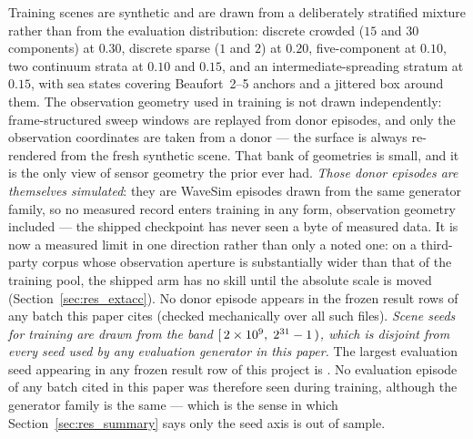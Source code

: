 \documentclass[review]{elsarticle}
\begin{document}
Training scenes are synthetic and are drawn from a deliberately stratified mixture
rather than from the evaluation distribution: discrete crowded ($15$ and $30$
components) at $0.30$, discrete sparse ($1$ and $2$) at $0.20$, five-component at
$0.10$, two continuum strata at $0.10$ and $0.15$, and an intermediate-spreading
stratum at $0.15$, with sea states covering Beaufort~2--5 anchors and a jittered
box around them. The observation geometry used in training is not drawn
independently: frame-structured sweep windows are replayed from \TrainDonors{} donor
episodes, and only the observation coordinates are taken from a donor --- the
surface is always re-rendered from the fresh synthetic scene. That bank of
\TrainDonors{} geometries is small, and it is the only view of sensor geometry the
prior ever had.
\emph{Those donor episodes are themselves simulated}: they are WaveSim episodes drawn
from the same generator family, so no measured record enters training in any form,
observation geometry included --- the shipped checkpoint has never seen a byte of
measured data.
It is now a measured limit in one direction rather than only a
noted one: on a third-party corpus whose observation aperture is substantially wider
than that of the training pool, the shipped arm has no skill until the absolute scale
is moved (Section~\ref{sec:res_extacc}). No donor
episode appears in the frozen result rows of any batch this paper cites (checked
mechanically over all \CitedBatchFiles{} such files).
\emph{Scene seeds for training are drawn from the band
$[\,2\times10^{9}{},\; 2^{31}-1{}\,)$, which is disjoint from every seed used by any
evaluation generator in this paper.} The largest evaluation seed appearing in any
frozen result row of this project is \EvalSeedMax{}. No evaluation episode of any
batch cited in this paper was therefore seen during training, although the generator
family is the same --- which
is the sense in which Section~\ref{sec:res_summary} says only the seed axis is out
of sample.
\end{document}
